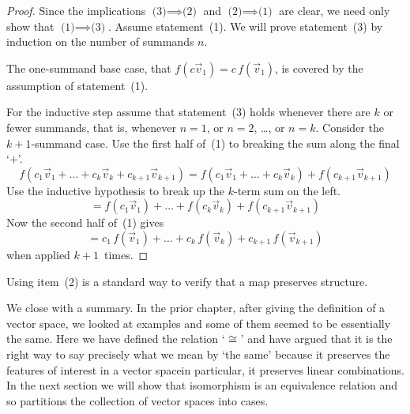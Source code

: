 \begin{proof}
Since the implications \mbox{$\text{(3)}\!\implies\!\text{(2)}$} and 
\mbox{$\text{(2)}\!\implies\!\text{(1)}$}
are clear, we need only show that \mbox{$\text{(1)}\!\implies\!\text{(3)}$}.
Assume statement~(1).
We will prove statement~(3) by induction on the number of summands $n$.

The one-summand base case, that
\( f(c\vec{v}_1)=c\,f(\vec{v}_1) \), is covered by the assumption of
statement~(1).

For the inductive step assume that statement~(3) holds whenever 
there are \( k \) or fewer summands, that is, whenever
$n=1$, or $n=2$, \ldots, or $n=k$.
Consider the $k+1$-summand case.
Use the first half of~(1) 
to breaking the sum along the final `$+$'.
\begin{equation*}
  f(c_1\vec{v}_1+\dots+c_k\vec{v}_k+c_{k+1}\vec{v}_{k+1})
  =f(c_1\vec{v}_1+\dots+c_k\vec{v}_k)+f(c_{k+1}\vec{v}_{k+1})
\end{equation*}
Use the inductive hypothesis to break up the $k$-term sum on the left.
\begin{equation*}
  =f(c_1\vec{v}_1)+\dots+f(c_k\vec{v}_k)+f(c_{k+1}\vec{v}_{k+1})
\end{equation*}
Now the second half of~(1) gives
\begin{equation*}
  =c_1\,f(\vec{v}_1)+\dots+c_k\,f(\vec{v}_k)+c_{k+1}\,f(\vec{v}_{k+1})
\end{equation*}
when applied $k+1$~times.
\end{proof}

\noindent Using item~(2) is a standard way to
verify that a map preserves structure.

We close with a summary.
In the prior chapter, after giving the definition of a vector space, 
we looked at examples and
some of them seemed to be essentially the same. 
Here we have defined the relation 
`\( {}\cong{} \)' and 
have argued that it
is the right way to 
say precisely what we mean by `the same'
because it preserves the features of interest in a vector
space\Dash in particular, it preserves linear combinations.
In the next section we will show that isomorphism
is an equivalence relation and so
partitions the collection of vector spaces
into cases.


